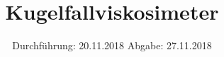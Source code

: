 

\subject{V207}
\title{Kugelfallviskosimeter}
\date{%
  Durchführung: 20.11.2018
  \hspace{3em}
  Abgabe: 27.11.2018
}



\maketitle
\thispagestyle{empty}
\tableofcontents
\newpage







\printbibliography{}


